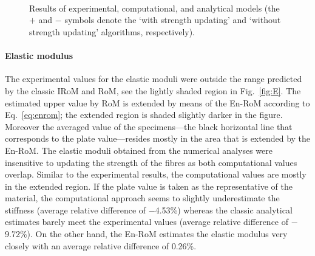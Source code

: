 	
\begin{figure}[!t]{}
  	\centering
  	\\
  	\\
 	\\
	\caption{Results of experimental, computational, and analytical models (the $+$ and $-$ symbols denote the `with strength updating' and `without strength updating' algorithms, respectively).}
	\label{fig:main_results}
\end{figure}%
\afterpage{\clearpage}


	\paragraph{Elastic modulus} The experimental values for the elastic moduli were outside the range predicted by the classic IRoM and RoM, see the lightly shaded region in Fig.~\ref{fig:E}. The estimated upper value by RoM is extended by means of the En-RoM according to Eq.~\eqref{eq:enrom}; the extended region is shaded slightly darker in the figure. Moreover the averaged value of the specimens---the black horizontal line that corresponds to the plate value---resides mostly in the area that is extended by the En-RoM. The elastic moduli obtained from the numerical analyses were insensitive to updating the strength of the fibres as both computational values overlap. Similar to the experimental results, the computational values are mostly in the extended region. If the plate value is taken as the representative of the material, the computational approach seems to slightly underestimate the stiffness (average relative difference of $-$4.53\%) whereas the classic analytical estimates barely meet the experimental values (average relative difference of $-$9.72\%). On the other hand, the En-RoM estimates the elastic modulus very closely with an average relative difference of 0.26\%. 

